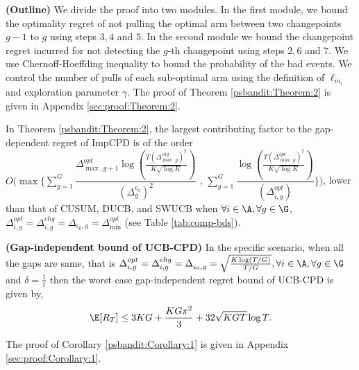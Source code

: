 \begin{customproof}{4} \textbf{(Outline)}
We divide the proof into two modules. In the first module, we bound the optimality regret of not pulling the optimal arm between two changepoints $g-1$ to $g$ using steps $3,4$ and $5$. In the second module we bound the changepoint regret incurred for not detecting the $g$-th changepoint using steps $2,6$ and $7$. We use Chernoff-Hoeffding inequality to bound the probability of the bad events. We control the number of pulls of each sub-optimal arm using the definition of $\ell_{m_i}$ and exploration parameter $\gamma$. The proof of Theorem \ref{psbandit:Theorem:2} is given in Appendix \ref{sec:proof:Theorem:2}.
\end{customproof}

\begin{discussion}
\label{dis:Theorem:2}
In Theorem \ref{psbandit:Theorem:2}, the largest contributing factor to the gap-dependent regret of  ImpCPD is of the order $O\big(\max\big\lbrace\sum\limits_{g=1}^G\dfrac{\Delta^{opt}_{\max,g+1}\log( \frac{T(\Delta^{chg}_{\max,g})^2}{K\sqrt{\log K}})}{(\Delta^{\epsilon_0}_{g})^2}$ , $\sum\limits_{g=1}^G\dfrac{\log(\frac{T (\Delta^{opt}_{\max,g})^2}{K\sqrt{\log K}})}{(\Delta^{opt}_{i,g})}\big\rbrace\big)$, lower than that of CUSUM, DUCB, and SWUCB when $\forall i\in\A, \forall g\in\G$, $\Delta^{opt}_{i,g} = \Delta^{chg}_{i,g} = \Delta^{}_{\epsilon_0, g} = \Delta^{opt}_{\min}$ (see Table \ref{tab:comp-bds}). 
\end{discussion}


\begin{customcorollary}{1}\textbf{(Gap-independent bound of UCB-CPD)}
\label{psbandit:Corollary:1}
In the specific scenario, when all the gaps are same, that is $\Delta^{opt}_{i,g}=\Delta^{chg}_{i,g}=\Delta^{}_{\epsilon_0, g}=\sqrt{\frac{K\log (T/G)}{T/G}}, \forall i\in\A,\forall g\in\G$ and $\delta=\frac{1}{t}$ then the worst case gap-independent regret bound of UCB-CPD is given by,
\begin{align*}
\E[R_{T}] \leq 3KG + \dfrac{KG \pi^2}{3} + 32\sqrt{KGT}\log T.
\end{align*}
\end{customcorollary}

\begin{customproof}{5}
The proof of Corollary \ref{psbandit:Corollary:1} is given in Appendix \ref{sec:proof:Corollary:1}.
\end{customproof}

